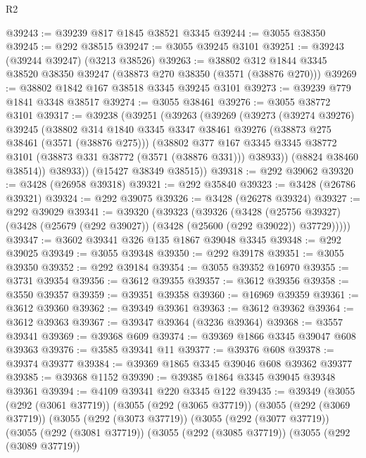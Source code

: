 \begin{lexlean}{R2}
\begin{coremodule}
@39243 := @39239 @817 @1845 @38521 @3345
@39244 := @3055 @38350
@39245 := @292 @38515
@39247 := @3055 @39245 @3101
@39251 := @39243 (@39244 @39247) (@3213 @38526)
@39263 := @38802 @312 @1844 @3345 @38520 @38350 @39247 (@38873 @270 @38350 (@3571 (@38876 @270)))
@39269 := @38802 @1842 @167 @38518 @3345 @39245 @3101
@39273 := @39239 @779 @1841 @3348 @38517
@39274 := @3055 @38461
@39276 := @3055 @38772 @3101
@39317 := @39238
    (@39251
      (@39263
        (@39269
          (@39273
            (@39274 @39276)
            @39245
            (@38802
              @314
              @1840
              @3345
              @3347
              @38461
              @39276
              (@38873 @275 @38461 (@3571 (@38876 @275)))
              (@38802
                @377
                @167
                @3345
                @3345
                @38772
                @3101
                (@38873 @331 @38772 (@3571 (@38876 @331)))
                @38933))
            (@8824 @38460 @38514))
          @38933))
      (@15427 @38349 @38515))
@39318 := @292 @39062
@39320 := @3428 (@26958 @39318)
@39321 := @292 @35840
@39323 := @3428 (@26786 @39321)
@39324 := @292 @39075
@39326 := @3428 (@26278 @39324)
@39327 := @292 @39029
@39341 := @39320
    (@39323
      (@39326
        (@3428
          (@25756 @39327)
          (@3428 (@25679 (@292 @39027)) (@3428 (@25600 (@292 @39022)) @37729)))))
@39347 := @3602 @39341 @326 @135 @1867 @39048 @3345
@39348 := @292 @39025
@39349 := @3055 @39348
@39350 := @292 @39178
@39351 := @3055 @39350
@39352 := @292 @39184
@39354 := @3055 @39352 @16970
@39355 := @3731 @39354
@39356 := @3612 @39355
@39357 := @3612 @39356
@39358 := @3550 @39357
@39359 := @39351 @39358
@39360 := @16969 @39359
@39361 := @3612 @39360
@39362 := @39349 @39361
@39363 := @3612 @39362
@39364 := @3612 @39363
@39367 := @39347 @39364 (@3236 @39364)
@39368 := @3557 @39341
@39369 := @39368 @609
@39374 := @39369 @1866 @3345 @39047 @608 @39363
@39376 := @3585 @39341 @11
@39377 := @39376 @608
@39378 := @39374 @39377
@39384 := @39369 @1865 @3345 @39046 @608 @39362 @39377
@39385 := @39368 @1152
@39390 := @39385 @1864 @3345 @39045 @39348 @39361
@39394 := @4109 @39341 @220 @3345 @122
@39435 := @39349
    (@3055
      (@292 (@3061 @37719))
      (@3055
        (@292 (@3065 @37719))
        (@3055
          (@292 (@3069 @37719))
          (@3055
            (@292 (@3073 @37719))
            (@3055
              (@292 (@3077 @37719))
              (@3055
                (@292 (@3081 @37719))
                (@3055
                  (@292 (@3085 @37719))
                  (@3055
                    (@292 (@3089 @37719))

\end{coremodule}
\end{lexlean}
